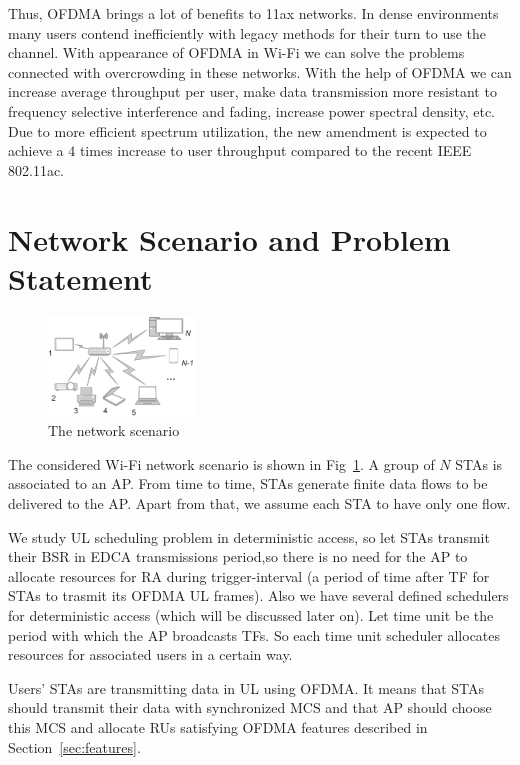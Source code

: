 Thus, OFDMA brings a lot of benefits to 11ax networks. In dense environments many users contend inefficiently with legacy methods for their turn to use the channel. 
With appearance of OFDMA in Wi-Fi we can solve the problems connected with overcrowding in these networks.
With the help of OFDMA we can increase average throughput per user, make data transmission more resistant to frequency selective interference and fading, increase power spectral density, etc. Due to more efficient spectrum utilization, the new amendment is expected to achieve a $4$ times increase to user throughput compared to the recent IEEE 802.11ac.

\section{Network Scenario and Problem Statement}
\label{sec:scenario}

\begin{figure}[t]
	\centering
	\includegraphics[width = 0.35\textwidth]{NetworkScenario}
	\caption{\label{fig:scenario} The network scenario}
\end{figure}

The considered Wi-Fi network scenario is shown in Fig~\ref{fig:scenario}. A group of $N$ STAs is associated to an AP.
From time to time, STAs generate finite data flows to be delivered to the AP. Apart from that, we assume each STA to have only one flow.

We study UL scheduling problem in deterministic access, so let STAs transmit their BSR in EDCA transmissions period,so there is no need for the AP to allocate resources for RA during trigger-interval (a period of time after TF for STAs to trasmit its OFDMA UL frames).
Also we have several defined schedulers for deterministic access (which will be discussed later on). 
Let time unit be the period with which the AP broadcasts TFs.
So each time unit scheduler allocates resources for associated users in a certain way.

Users' STAs are transmitting data in UL using OFDMA. 
It means that STAs should transmit their data with synchronized MCS and that AP should choose this MCS and allocate RUs satisfying OFDMA features described in Section~\ref{sec:features}. 

